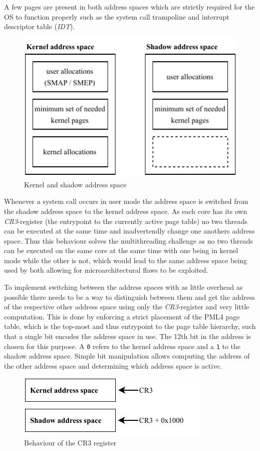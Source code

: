 A few pages are present in both address spaces which are strictly required for the OS to function properly such as the system call trampoline and interrupt descriptor table (\textit{IDT}).

\begin{figure}[h]
  \begin{center}
    \includegraphics[page=1,width=.4\textwidth]{fig/prebuilt_shadow_address_space}
  \end{center}
  \caption{Kernel and shadow address space}
  \label{fig:shadow_address_space}
\end{figure}

Whenever a system call occurs in user mode the address space is switched from the shadow address space to the kernel address space.
As each core has its own \textit{CR3}-register (the entrypoint to the currently active page table) no two threads can be executed at the same time and inadvertendly change one anothers address space.
Thus this behaviour solves the multithreading challenge as no two threads can be executed on the same core at the same time with one being in kernel mode while the other is not, which would lead to the same address space being used by both allowing for microarchitectural flaws to be exploited.

To implement switching between the address spaces with as little overhead as possible there needs to be a way to distinguish between them and get the address of the respective other address space using only the \textit{CR3}-register and very little computation.
This is done by enforcing a strict placement of the PML4 page table, which is the top-most and thus entrypoint to the page table hierarchy, such that a single bit encodes the address space in use.
The 12th bit in the address is chosen for this purpose.
A \lstinline{0} refers to the kernel address space and a \lstinline{1} to the shadow address space.
Simple bit manipulation allows computing the address of the other address space and determining which address space is active.

\begin{figure}[h]
  \begin{center}
    \includegraphics[page=1,width=.3\textwidth]{fig/prebuilt_cr3-register}
  \end{center}
  \caption{Behaviour of the CR3 register}
  \label{fig:cr3-register}
\end{figure}

